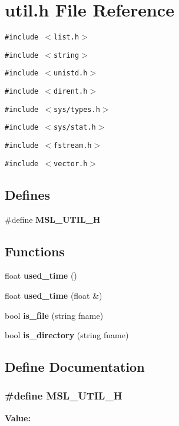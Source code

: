 \section{util.h File Reference}
\label{util_8h}
{\tt \#include $<$list.h$>$}\par
{\tt \#include $<$string$>$}\par
{\tt \#include $<$unistd.h$>$}\par
{\tt \#include $<$dirent.h$>$}\par
{\tt \#include $<$sys/types.h$>$}\par
{\tt \#include $<$sys/stat.h$>$}\par
{\tt \#include $<$fstream.h$>$}\par
{\tt \#include $<$vector.h$>$}\par
\subsection*{Defines}
\begin{CompactItemize}
\item 
\#define {\bf MSL\_\-UTIL\_\-H}
\end{CompactItemize}
\subsection*{Functions}
\begin{CompactItemize}
\item 
float {\bf used\_\-time} ()
\item 
float {\bf used\_\-time} (float \&)
\item 
bool {\bf is\_\-file} (string fname)
\item 
bool {\bf is\_\-directory} (string fname)
\end{CompactItemize}


\subsection{Define Documentation}
\subsubsection{\setlength{\rightskip}{0pt plus 5cm}\#define MSL\_\-UTIL\_\-H}\label{util_8h_a0}


{\bf Value:}\footnotesize\begin{verbatim}
\end{verbatim}\normalsize 


